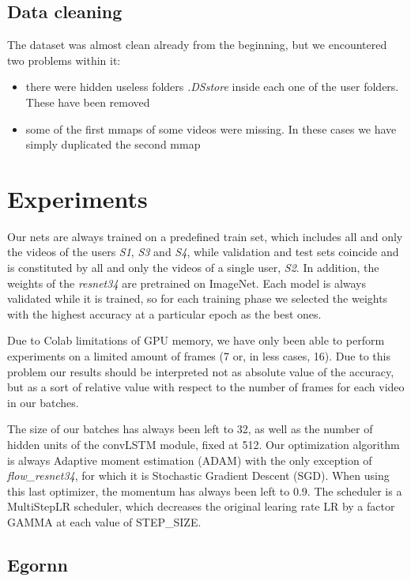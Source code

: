 \documentclass[10pt,twocolumn,hidelinks,letterpaper]{article}
\begin{document}
\subsection{Data cleaning}

The dataset was almost clean already from the beginning, but we encountered two problems within it:
\begin{itemize}
  \item there were hidden useless folders \textit{.DSstore} inside each one of the user folders. These have been removed
  \item some of the first mmaps of some videos were missing. In these cases we have simply duplicated the second mmap
\end{itemize}


\section{Experiments}

Our nets are always trained on a predefined train set, which includes all and only the videos of the users \textit{S1}, \textit{S3} and \textit{S4}, while validation and test sets coincide and is constituted by all and only the videos of a single user, \textit{S2}. In addition, the weights of the \textit{resnet34} are pretrained on ImageNet. Each model is always validated while it is trained, so for each training phase we selected the weights with the highest accuracy at a particular epoch as the best ones.

Due to Colab limitations of GPU memory, we have only been able to perform experiments on a limited amount of frames (7 or, in less cases, 16). Due to this problem our results should be interpreted not as absolute value of the accuracy, but as a sort of relative value with respect to the number of frames for each video in our batches.

The size of our batches has always been left to 32, as well as the number of hidden units of the convLSTM module, fixed at 512. Our optimization algorithm is always Adaptive moment estimation (ADAM) with the only exception of \textit{flow\_resnet34}, for which it is Stochastic Gradient Descent (SGD). When using this last optimizer, the momentum has always been left to 0.9. The scheduler is a MultiStepLR scheduler, which decreases the original learing rate LR by a factor GAMMA at each value of STEP\_SIZE.

\subsection{Egornn}
\end{document}
